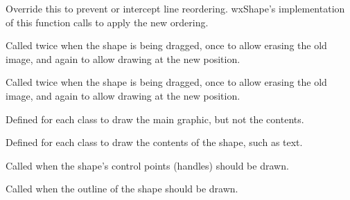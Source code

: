\label{wxshapeevthandleronchangeattachment}


Override this to prevent or intercept line reordering. wxShape's implementation of this function
calls  to apply
the new ordering.



Called twice when the shape is being dragged, once to allow erasing the old
image, and again to allow drawing at the new position.



Called twice when the shape is being dragged, once to allow erasing the old
image, and again to allow drawing at the new position.



Defined for each class to draw the main graphic, but
not the contents.



Defined for each class to draw the contents of the
shape, such as text.



Called when the shape's control points (handles) should
be drawn.



Called when the outline of the shape should be drawn.


